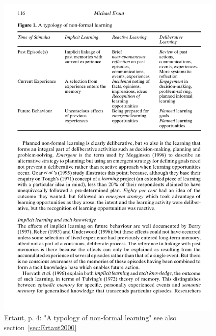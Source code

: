 \documentclass[12pt,a4paper]{article}
\begin{document}
    \begin{figure}[ht]
      \centering
      \includegraphics[width=12cm]{Meeting 4 NON-FORMAL LEARNING - Seite 4.pdf}
      \caption{Ertaut, p. 4: "A typology of non-formal learning" see also section~\ref{sec:Ertaut2000}}
      \label{fig:Ertaut typology}
    \end{figure}
\end{document}
